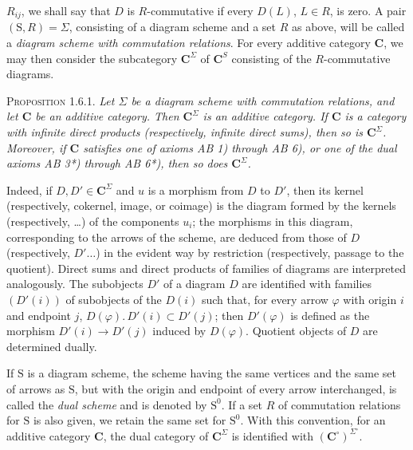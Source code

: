 
\noindent $R_{ij}$, we shall say that $D$ is $R$-commutative if every $D(L)$,
$L\in R$, is zero. A pair $(\mathrm{S},R)=\Sigma$, consisting of a diagram scheme and a
set $R$ as above, will be called a \textit{diagram scheme with commutation
relations}. For every additive category $\mathbf{C}$, we may then consider the
subcategory $\mathbf{C}^\Sigma$ of $\mathbf{C}^S$ consisting of the $R$-commutative diagrams.

\textsc{Proposition 1.6.1.} \textit{Let $\Sigma$ be a diagram
scheme with commutation relations, and let $\mathbf{C}$ be an additive category. Then
$\mathbf{C}^\Sigma$ is an additive category. If $\mathbf{C}$ is a category with infinite direct
products (respectively, infinite direct sums), then so is $\mathbf{C}^\Sigma$.
Moreover, if $\mathbf{C}$ satisfies one of axioms \textup{AB 1)} through \textup{AB 6)}, or one of the
dual axioms \textup{AB 3*)} through \textup{AB 6*)}, then so does $\mathbf{C}^\Sigma$.}

Indeed, if $D,D'\in \mathbf{C}^\Sigma$ and $u$ is a morphism from $D$ to $D'$, then its
kernel (respectively, cokernel, image, or coimage) is the diagram formed by the
kernels (respectively, \ldots) of the components $u_i$; the morphisms in this
diagram, corresponding to the arrows of the scheme, are deduced from those of
$D$ (respectively, $D'\ldots$) in the evident way by restriction
(respectively, passage to the quotient). Direct sums and direct products of
families of diagrams are interpreted analogously. The subobjects $D'$ of a
diagram $D$ are identified with families $(D'(i))$ of subobjects of the
$D(i)$ such that, for every arrow $\varphi$ with origin $i$ and endpoint $j$,
$D(\varphi).\,D'(i)\subset D'(j)$; then $D'(\varphi)$ is defined as the morphism
$D'(i)\to D'(j)$ induced by $D(\varphi)$. Quotient objects of $D$
are determined dually.

If $\mathrm{S}$ is a diagram scheme, the scheme having the same vertices and the same
set of arrows as $\mathrm{S}$, but with the origin and endpoint of every arrow
interchanged, is called the \textit{dual scheme} and is denoted by $\mathrm{S}^0$.
If a set $R$ of commutation relations for $\mathrm{S}$ is also given, we retain the
same set for $\mathrm{S}^0$. With this convention, for an additive category $\mathbf{C}$,
the dual category of $\mathbf{C}^\Sigma$ is identified with
$(\mathbf{C}^\circ)^{\Sigma^\circ}$.


